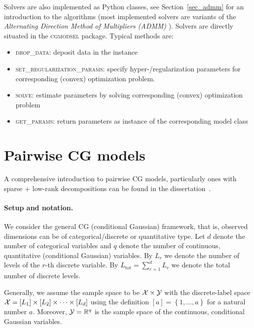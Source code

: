 \documentclass{article}
\def\tot{\text{tot}}
\newcommand{\IR}{{\mathbb{R}}}\newcommand{\IN}{{\mathbb{N}}}
\newcommand{\bPc}[1]{\ensuremath{\left\{#1 \right\}}} %
\begin{document}
Solvers are also implemented as Python classes, see Section~\ref{sec_admm} for an introduction to the algorithms (most implemented solvers are variants of the \emph{Alternating Direction Method of Multipliers (ADMM)} \cite{boyd2011distributed}). Solvers are directly situated in the \textsc{cgmodsel} package. Typical methods are:
\begin{itemize}
 \item \textsc{drop\_data}: deposit data in the instance
 \item \textsc{set\_regularization\_params}: specify hyper-/regularization parameters for corresponding (convex) optimization problem.
 \item \textsc{solve}: estimate parameters by solving corresponding (convex) optimization problem
 \item \textsc{get\_params}: return parameters as instance of the corresponding model class
\end{itemize}




\section{Pairwise CG models}
\label{s_pairwise}

A comprehensive introduction to pairwise CG models, particularly ones with sparse + low-rank decompositions can be found in the dissertation~\cite{nussbaum2021models}.

\paragraph{Setup and notation.}
We consider the general CG (conditional Gaussian) framework, that is, observed dimensions can be of categorical/discrete or quantitative type. 
Let $d$ denote the number of categorical variables and $q$ denote the number of continuous, quantitative (conditional Gaussian) variables.
By $L_r$ we denote the number of levels of the $r$-th discrete variable.
 By $L_{\tot} = \sum_{r=1}^{d} L_r$ we denote the total number of discrete levels.

Generally, we assume the sample space to be $\mathcal{X}\times \mathcal{Y}$ with the discrete-label space $\mathcal{X}=[L_1]\times[L_2]\times\cdots\times [L_{d}]$ using the definition $[a] =\bPc{1,\ldots, a}$ for a natural number $a$. Moreover, $\Y=\IR^{q}$ is the sample space of the continuous, conditional Gaussian variables.
\end{document}
